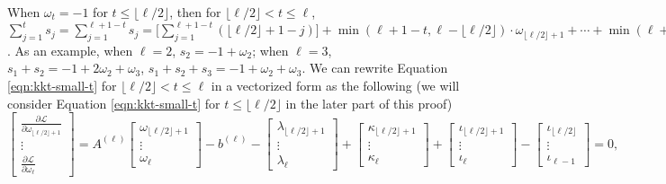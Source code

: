 			When  $\omega_t = -1$ for $t \leq \lfloor \ell/2 \rfloor$, then for $ \lfloor \ell/2 \rfloor < t \leq \ell$, $\sum_{j=1}^t s_j = \sum_{j = 1}^{\ell+1-t} s_j = \big[ \sum_{j = 1}^{\ell+1-t} (\lfloor \ell/2 \rfloor + 1 - j) \big] + \min(\ell+1-t, \ell - \lfloor \ell/2 \rfloor) \cdot \omega_{\lfloor \ell/2 \rfloor+1} + \cdots + \min(\ell+1-t, 2) \cdot   \omega_{\ell-1} + \min(\ell+1-t, 1) \cdot \omega_{\ell}$. As an example, when $\ell = 2$, $s_2=-1+\omega_2$; when $\ell = 3$, $s_1+s_2 = -1+2\omega_2+\omega_3$, $s_1+s_2+s_3 = -1 + \omega_2 + \omega_3$. We can rewrite Equation \eqref{eqn:kkt-small-t} for  $ \lfloor \ell/2 \rfloor < t \leq \ell$ in a vectorized form as the following (we will consider Equation \eqref{eqn:kkt-small-t} for $t \leq \lfloor \ell/2 \rfloor$ in the later part of this proof)
			\begin{equation} 
			\begin{bmatrix}
			\frac{\partial \mathcal{L}}{\partial \omega_{\lfloor \ell/2 \rfloor+1} }\\ \vdots \\  \frac{\partial \mathcal{L}}{\partial  \omega_{\ell} }
			\end{bmatrix} = A^{(\ell)} \begin{bmatrix}
			\omega_{\lfloor \ell/2 \rfloor+1} \\ \vdots \\   \omega_{\ell}
			\end{bmatrix} - b^{(\ell)} - \begin{bmatrix}
			\lambda_{\lfloor \ell/2 \rfloor+1} \\ \vdots \\ \lambda_{\ell}
			\end{bmatrix} + \begin{bmatrix}
			\kappa_{\lfloor \ell/2 \rfloor+1} \\ \vdots \\ \kappa_{\ell}
			\end{bmatrix} + \begin{bmatrix}
			\iota_{\lfloor \ell/2 \rfloor+1} \\ \vdots \\ \iota_{\ell}
			\end{bmatrix} - \begin{bmatrix}
			\iota_{\lfloor \ell/2 \rfloor} \\ \vdots \\ \iota_{\ell-1}
			\end{bmatrix} = 0 \label{eqn:kkt-small-t-simplified},
			\end{equation}
